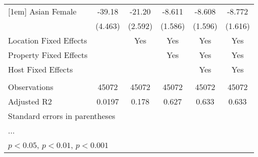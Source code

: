 \begin{table}[htbp]
\begin{tabular}{l*{5}{c}}
[1em]
Asian Female        &      -39.18\sym{***}&      -21.20\sym{***}&      -8.611\sym{***}&      -8.608\sym{***}&      -8.772\sym{***}\\
                    &     (4.463)         &     (2.592)         &     (1.586)         &     (1.596)         &     (1.616)         \\
\hline
Location Fixed Effects&                     &         Yes         &         Yes         &         Yes         &         Yes         \\
Property Fixed Effects&                     &                     &         Yes         &         Yes         &         Yes         \\
Host Fixed Effects  &                     &                     &                     &         Yes         &         Yes         \\
\hline \vspace{-1.25em}&                     &                     &                     &                     &                     \\
Observations        &       45072         &       45072         &       45072         &       45072         &       45072         \\
Adjusted R2         &      0.0197         &       0.178         &       0.627         &       0.633         &       0.633         \\
\hline\hline
\multicolumn{6}{l}{\footnotesize Standard errors in parentheses}\\
\multicolumn{6}{l}{\footnotesize ...}\\
\multicolumn{6}{l}{\footnotesize \sym{*} \(p<0.05\), \sym{**} \(p<0.01\), \sym{***} \(p<0.001\)}\\
\end{tabular}
\end{table}
